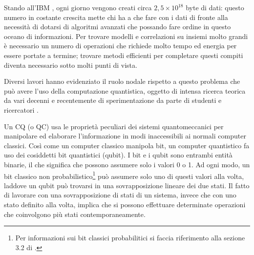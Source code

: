 
Stando all'IBM \cite{ibm-big-data}, ogni giorno vengono creati circa $2,5\times10^{18}$ byte di dati: 
questo numero in costante crescita mette chi ha a che fare con i dati di fronte 
alla necessità di dotarsi di algoritmi avanzati che possando fare ordine in questo 
oceano di informazioni. Per trovare modelli e correlazioni su insiemi molto grandi
è necessario un numero di operazioni che richiede molto tempo ed 
energia per essere portate a termine; trovare metodi efficienti per completare 
questi compiti diventa necessario sotto molti punti di vista. 

Diversi lavori hanno evidenziato il ruolo nodale rispetto a questo problema 
che può avere l'uso della computazione quantistica, 
oggetto di intensa ricerca teorica da vari decenni 
e recentemente di sperimentazione da parte di studenti \cite{fingerhuth} e ricercatori \cite{schuld}. 

Un \ac{CQ} (o \ac{QC}) usa le proprietà peculiari dei sistemi quantomeccanici per manipolare 
ed elaborare l'informazione in modi inaccessibili ai normali computer classici. 
Così come un computer classico manipola bit, un computer quantistico fa uso dei 
cosiddetti bit quantistici (qubit). I bit e i qubit sono entrambi entità binarie, 
il che significa che possono assumere solo i valori 0 o 1. Ad ogni modo, un bit 
classico non probabilistico\footnote{Per informazioni sui bit classici 
probabilitici si faccia riferimento alla sezione 3.2 di \cite{mannucci}.} 
può assumere solo uno di questi valori alla volta, 
laddove un qubit può trovarsi in una sovrapposizione lineare dei due stati. 
Il fatto di lavorare con una sovrapposizione di stati di un sistema, 
invece che con uno stato definito alla volta, implica che si possono effettuare 
determinate operazioni che coinvolgono più stati contemporaneamente. 

